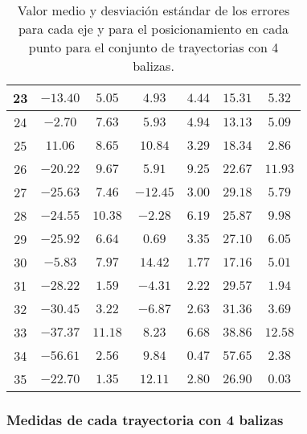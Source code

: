 \begin{table}[H]
\begin{tabular}{|c|c|c|c|c|c|c|}
        23   &  $-13.40$  &  $5.05$   &   $4.93$    &   $4.44$  &  $15.31$  & $5.32$   \\ \hline
        24   &  $-2.70$   &  $7.63$   &   $5.93$    &   $4.94$  &  $13.13$  & $5.09$   \\ \hline
        25   &  $11.06$   &  $8.65$   &   $10.84$   &   $3.29$  &  $18.34$  & $2.86$   \\ \hline
        26   &  $-20.22$  &  $9.67$   &   $5.91$    &   $9.25$  &  $22.67$  & $11.93$  \\ \hline
        27   &  $-25.63$  &  $7.46$   &   $-12.45$  &   $3.00$  &  $29.18$  & $5.79$   \\ \hline
        28   &  $-24.55$  &  $10.38$  &   $-2.28$   &   $6.19$  &  $25.87$  & $9.98$   \\ \hline
        29   &  $-25.92$  &  $6.64$   &   $0.69$    &   $3.35$  &  $27.10$  & $6.05$   \\ \hline
        30   &  $-5.83$   &  $7.97$   &   $14.42$   &   $1.77$  &  $17.16$  & $5.01$   \\ \hline
        31   &  $-28.22$  &  $1.59$   &   $-4.31$   &   $2.22$  &  $29.57$  & $1.94$   \\ \hline
        32   &  $-30.45$  &  $3.22$   &   $-6.87$   &   $2.63$  &  $31.36$  & $3.69$   \\ \hline
        33   &  $-37.37$  &  $11.18$  &   $8.23$    &   $6.68$  &  $38.86$  & $12.58$  \\ \hline
        34   &  $-56.61$  &  $2.56$   &   $9.84$    &   $0.47$  &  $57.65$  & $2.38$   \\ \hline
        35   &  $-22.70$  &  $1.35$   &   $12.11$   &   $2.80$  &  $26.90$  & $0.03$   \\ \hline
    \end{tabular}
    \caption{Valor medio y desviación estándar de los errores para cada eje y para el posicionamiento en cada punto para el conjunto de trayectorias con 4 balizas.}
    \label{tab:media_lab_4_total}
\end{table}

\newpage
\subsubsection*{Medidas de cada trayectoria con 4 balizas}

